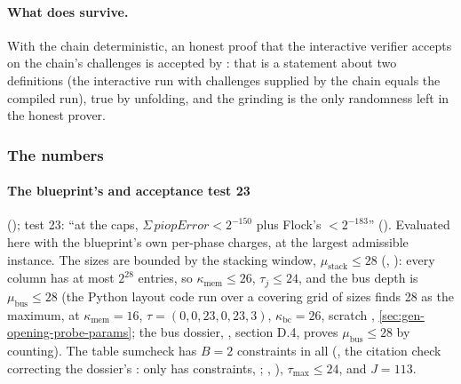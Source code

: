 \paragraph{What does survive.} With the chain deterministic, an honest proof that the interactive
verifier accepts on the chain's challenges is accepted by : that is a statement about
two definitions (the interactive run with challenges supplied by the chain equals the compiled
run), true by unfolding, and the grinding is the only randomness left in the honest prover.

\subsubsection{The numbers}\label{sec:gen-opening-numbers}

\paragraph{The blueprint's \texorpdfstring{}{piopError_le} and acceptance test 23}\label{sec:gen-opening-piop-error}

\begin{sloppypar}
(); test 23: ``at the caps, $Σ\,\mathit{piopError} < 2^{-150}$ plus Flock's
$< 2^{-183}$'' (). Evaluated here with the blueprint's own per-phase charges, at
the largest admissible instance. The sizes are bounded by the stacking window,
$μ_{\mathrm{stack}} ≤ 28$ (, ): every column has at most
$2^{28}$ entries, so $κ_{\mathrm{mem}} ≤ 26$, $τ_j ≤ 24$, and the bus depth is $μ_{\mathrm{bus}} ≤ 28$
(the Python layout code run over a covering grid of sizes finds 28 as the maximum, at
$κ_{\mathrm{mem}} = 16$, $τ = (0, 0, 23, 0, 23, 3)$, $κ_{\mathrm{bc}} = 26$, scratch
, \cref{sec:gen-opening-probe-params}; the bus dossier, ,
section D.4, proves $μ_{\mathrm{bus}} ≤ 28$ by counting). The table sumcheck has $B = 2$ constraints
in all (, the citation check correcting the dossier's : only
 has constraints, ;
, ), $τ_{\max} ≤ 24$, and $J = 113$.
\end{sloppypar}

